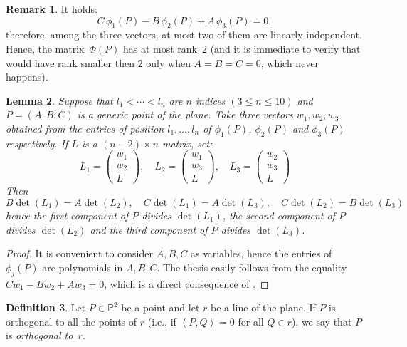 \documentclass[12pt, a4paper, reqno, captions=tableheading,bibliography=totoc]{scrartcl}
\theoremstyle{plain}
\newtheorem{lemma}{Lemma}[section]
\theoremstyle{definition}
\newtheorem{definition}[lemma]{Definition}
\newtheorem{rmk}[lemma]{Remark}
\newcommand{\p}{\mathbb{P}}
\newcommand{\scl}[2]{\left\langle {#1}, {#2} \right\rangle}
\begin{document}
\begin{rmk}
 It holds:
\begin{equation}
  C \, \phi_1(P) - B \, \phi_2(P) + A \, \phi_3(P) = 0,
  \label{eq:base}
\end{equation}
therefore,
among the three vectors, at most two of them are linearly independent.
Hence, the matrix~$\Phi(P)$ has at most rank~$2$ (and it is immediate to
verify that would have rank smaller then $2$ only when $A=B=C=0$, which never happens).
\end{rmk}

\begin{lemma}
Suppose that $l_1 < \cdots <l_n$ are
  $n$ indices $(3 \leq n \leq 10)$ and $P = (A: B: C)$ is a generic point of
  the plane. Take three vectors $w_1, w_2, w_3$
  obtained from the entries of position $l_1, \dots, l_n$
  of $\phi_1(P)$, $\phi_2(P)$ and $\phi_3(P)$ respectively.
  If $L$ is a $(n-2) \times n$ matrix, set:
  \[
  L_1 = \left(\begin{array}{c}w_1 \\ w_2 \\ L\end{array}  \right), \quad
  L_2 = \left(\begin{array}{c}w_1 \\ w_3 \\ L\end{array}  \right), \quad
  L_3 = \left(\begin{array}{c}w_2 \\ w_3 \\ L\end{array}  \right)
  \]
  Then
  \[
  B \det(L_1) = A \det(L_2), \quad
  C \det(L_1) = A \det(L_3), \quad
  C \det(L_2) = B \det(L_3)
  \]
  hence the first component of $P$ divides $\det(L_1)$, the second
  component of $P$ divides $\det(L_2)$ and the third component of
  $P$ divides $\det(L_3)$.
  \label{lemma1}
\end{lemma}
\begin{proof} It is convenient to consider $A, B, C$ as variables, hence
  the entries of $\phi_j(P)$ are polynomials in $A, B, C$.
  The thesis easily follows from the equality $C w_1 - B w_2 + A w_3 = 0$, which
  is a direct consequence of .
\end{proof}

\begin{definition}
Let $P \in \p^2$ be a point and let $r$ be a line of the plane.
If $P$ is orthogonal to all the points of $r$ (i.e., if $\scl{P}{Q} = 0$ for
all $Q \in r$), we say that $P$ is \emph{orthogonal to~$r$}.
\end{definition}
\end{document}
